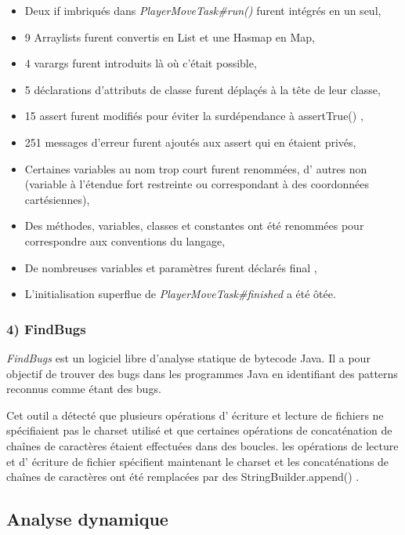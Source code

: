 \documentclass[12pt, openany]{report}
\begin{document}
\begin{itemize}
	\item Deux \og if \fg{} imbriqués dans \mbox{\textit{PlayerMoveTask\#run()}} furent intégrés en un seul,
	\item 9 Arraylists furent convertis en List et une Hasmap en Map,
	\item 4 \og varargs \fg{} furent introduits là où c'était possible,
	\item 5 déclarations d'attributs de classe furent déplaçés à la tête de leur classe,
	\item 15 \og assert \fg{} furent modifiés pour éviter la surdépendance à \og assertTrue() \fg{},
	\item 251 messages d'erreur furent ajoutés aux \og assert \fg{} qui en étaient privés,
	\item Certaines variables au nom trop court furent renommées, d' autres non (variable à l'étendue fort restreinte ou correspondant à des coordonnées cartésiennes),
	\item Des méthodes, variables, classes et constantes ont été renommées pour correspondre aux conventions du langage,
	\item De nombreuses variables et paramètres furent déclarés \og final \fg{},
	\item L'initialisation superflue de \mbox{\textit{PlayerMoveTask\#finished}} a été ôtée.
\end{itemize}

\subsubsection*{4) FindBugs}

\textit{FindBugs} est un logiciel libre d'analyse statique de bytecode Java. Il a pour objectif de trouver des bugs dans les programmes Java en identifiant des patterns reconnus comme étant des bugs.

Cet outil a détecté que plusieurs opérations d' écriture et lecture de fichiers ne spécifiaient pas le \og charset \fg utilisé et que certaines opérations de concaténation de chaînes de caractères étaient effectuées dans des boucles.
les opérations de lecture et d' écriture de fichier spécifient maintenant le \og charset \fg \space et les concaténations de chaînes de caractères ont été remplacées par des \og StringBuilder.append() \fg.
\subsection{Analyse dynamique}
\end{document}
